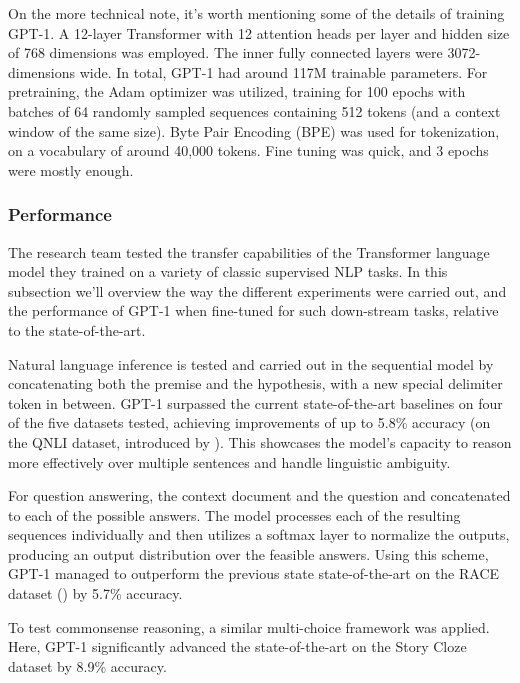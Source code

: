 \documentclass{article}
\begin{document}
\medskip
\noindent
On the more technical note, it's worth mentioning some of the details of training GPT-1. A 12-layer Transformer with 12 attention heads per layer and hidden size of 768 dimensions was employed. The inner fully connected layers were 3072-dimensions wide. In total, GPT-1 had around 117M trainable parameters. For pretraining, the Adam optimizer was utilized, training for 100 epochs with batches of 64 randomly sampled sequences containing 512 tokens (and a context window of the same size). Byte Pair Encoding (BPE) was used for tokenization, on a vocabulary of around 40,000 tokens. Fine tuning was quick, and 3 epochs were mostly enough.

\subsubsection{Performance}
\label{subsec:gpt1-perform}

The research team tested the transfer capabilities of the Transformer language model they trained on a variety of classic supervised NLP tasks. In this subsection we'll overview the way the different experiments were carried out, and the performance of GPT-1 when fine-tuned for such down-stream tasks, relative to the state-of-the-art.

\medskip
\noindent
Natural language inference is tested and carried out in the sequential model by concatenating both the premise and the hypothesis, with a new special delimiter token in between. GPT-1 surpassed the current state-of-the-art baselines on four of the five datasets tested, achieving improvements of up to 5.8\% accuracy (on the QNLI dataset, introduced by \citet{wang2018glue}). This showcases the model's capacity to reason more effectively over multiple sentences and handle linguistic ambiguity.

\medskip
\noindent
For question answering, the context document and the question and concatenated to each of the possible answers. The model processes each of the resulting sequences individually and then utilizes a softmax layer to normalize the outputs, producing an output distribution over the feasible answers. Using this scheme, GPT-1 managed to outperform the previous state state-of-the-art on the RACE dataset (\citet{lai2017race}) by 5.7\% accuracy.

\medskip
\noindent
To test commonsense reasoning, a similar multi-choice framework was applied. Here, GPT-1 significantly advanced the state-of-the-art on the Story Cloze dataset \citet{mostafazadeh2017cloze} by 8.9\% accuracy.
\end{document}
